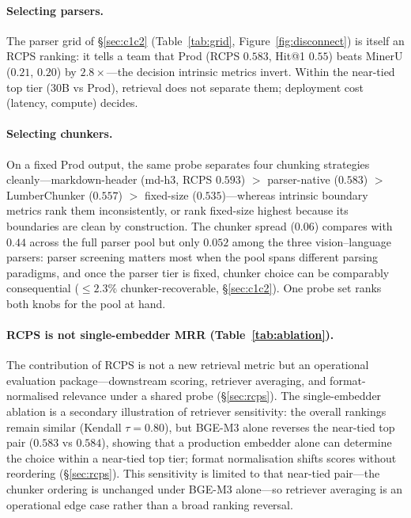 \documentclass[11pt]{article}
\newcommand{\rcps}{\textsc{RCPS}}
\begin{document}
\paragraph{Selecting parsers.} The parser grid of \S\ref{sec:c1c2} (Table~\ref{tab:grid}, Figure~\ref{fig:disconnect}) is itself an \rcps{} ranking: it tells a team that Prod (\rcps{} $0.583$, Hit@1 $0.55$) beats MinerU ($0.21$, $0.20$) by $2.8\times$---the decision intrinsic metrics invert. Within the near-tied top tier (30B vs Prod), retrieval does not separate them; deployment cost (latency, compute) decides.

\paragraph{Selecting chunkers.} On a fixed Prod output, the same probe separates four chunking strategies cleanly---markdown-header (md-h3, \rcps{} $0.593$) $>$ parser-native ($0.583$) $>$ LumberChunker \citep{duarte2024lumber} ($0.557$) $>$ fixed-size ($0.535$)---whereas intrinsic boundary metrics rank them inconsistently, or rank fixed-size highest because its boundaries are clean by construction. The chunker spread ($0.06$) compares with $0.44$ across the full parser pool but only $0.052$ among the three vision--language parsers: parser screening matters most when the pool spans different parsing paradigms, and once the parser tier is fixed, chunker choice can be comparably consequential ($\le 2.3\%$ chunker-recoverable, \S\ref{sec:c1c2}). One probe set ranks both knobs for the pool at hand.

\paragraph{\rcps{} is not single-embedder MRR (Table~\ref{tab:ablation}).} The contribution of \rcps{} is not a new retrieval metric but an operational evaluation package---downstream scoring, retriever averaging, and format-normalised relevance under a shared probe (\S\ref{sec:rcps}). The single-embedder ablation is a secondary illustration of retriever sensitivity: the overall rankings remain similar (Kendall $\tau = 0.80$), but BGE-M3 alone reverses the near-tied top pair ($0.583$ vs $0.584$), showing that a production embedder alone can determine the choice within a near-tied top tier; format normalisation shifts scores without reordering (\S\ref{sec:rcps}). This sensitivity is limited to that near-tied pair---the chunker ordering is unchanged under BGE-M3 alone---so retriever averaging is an operational edge case rather than a broad ranking reversal.
\end{document}
